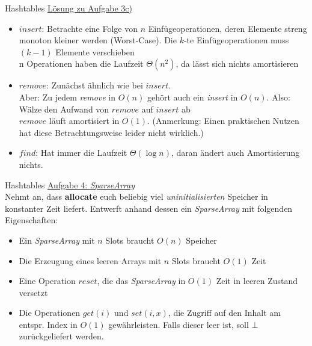 \begin{frame}{Hashtables}
	\underline{Lösung zu Aufgabe 3c)}
	\begin{itemize}
		\item $insert$: Betrachte eine Folge von $n$ Einfügeoperationen, deren Elemente streng monoton kleiner werden (Worst-Case). Die $k$-te Einfügeoperationen muss $(k-1)$ Elemente verschieben \\
		\impl n Operationen haben die Laufzeit $\Theta(n^2)$, da lässt sich nichts amortisieren
		\pause
		\item $remove$: Zunächst ähnlich wie bei $insert$. \\
		Aber: Zu jedem \emph{remove} in $O(n)$ gehört auch ein \emph{insert} in $O(n)$. Also: Wälze den Aufwand von $remove$ auf $insert$ ab \\ \impl $remove$ läuft amortisiert in $O(1)$. {\small (Anmerkung: Einen praktischen Nutzen hat diese Betrachtungsweise leider nicht wirklich.)}
		\pause
		\item 	$find$: Hat immer die Laufzeit $\Theta(\log n)$, daran ändert auch Amortisierung nichts.
	\end{itemize}
\end{frame}



\begin{frame}{Hashtables}
	\underline{Aufgabe 4: \emph{SparseArray}} \\
	Nehmt an, dass \textbf{allocate} euch beliebig viel \emph{uninitialisierten} Speicher in konstanter Zeit liefert. Entwerft anhand dessen ein \emph{SparseArray} mit folgenden Eigenschaften: 
	\begin{itemize}
		\item Ein \emph{SparseArray} mit $n$ Slots braucht $O(n)$ Speicher
		\item Die Erzeugung eines leeren Arrays mit $n$ Slots braucht $O(1)$ Zeit
		\item Eine Operation $reset$, die das \emph{SparseArray} in $O(1)$ Zeit in leeren Zustand versetzt
		\item Die Operationen $get(i)$ und $set(i, x)$, die Zugriff auf den Inhalt am entspr. Index in $O(1)$ gewährleisten. Falls dieser leer ist, soll $\bot$ zurückgeliefert werden.
	\end{itemize}
\end{frame}

